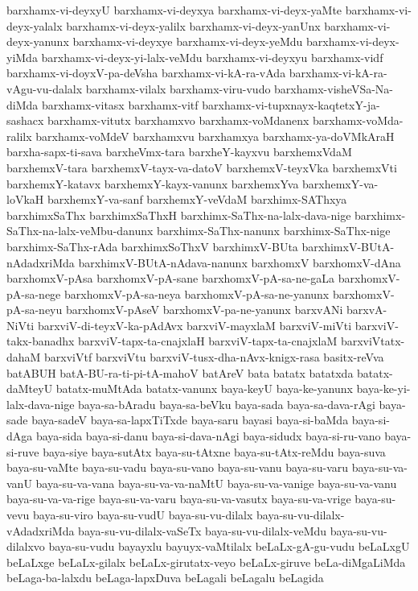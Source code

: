 {barxhamx-vi-deyxyU
barxhamx-vi-deyxya
barxhamx-vi-deyx-yaMte
barxhamx-vi-deyx-yalalx
barxhamx-vi-deyx-yalilx
barxhamx-vi-deyx-yanUnx
barxhamx-vi-deyx-yanunx
barxhamx-vi-deyxye
barxhamx-vi-deyx-yeMdu
barxhamx-vi-deyx-yiMda
barxhamx-vi-deyx-yi-lalx-veMdu
barxhamx-vi-deyxyu
barxhamx-vidf
barxhamx-vi-doyxV-pa-deVsha
barxhamx-vi-kA-ra-vAda
barxhamx-vi-kA-ra-vAgu-vu-dalalx
barxhamx-vilalx
barxhamx-viru-vudo
barxhamx-visheVSa-Na-diMda
barxhamx-vitasx
barxhamx-vitf
barxhamx-vi-tupxnayx-kaqtetxY-ja-sashacx
barxhamx-vitutx
barxhamxvo
barxhamx-voMdanenx
barxhamx-voMda-ralilx
barxhamx-voMdeV
barxhamxvu
barxhamxya
barxhamx-ya-doVMkAraH
barxha-sapx-ti-sava
barxheVmx-tara
barxheY-kayxvu
barxhemxVdaM
barxhemxV-tara
barxhemxV-tayx-va-datoV
barxhemxV-teyxVka
barxhemxVti
barxhemxY-katavx
barxhemxY-kayx-vanunx
barxhemxYva
barxhemxY-va-loVkaH
barxhemxY-va-sanf
barxhemxY-veVdaM
barxhimx-SAThxya
barxhimxSaThx
barxhimxSaThxH
barxhimx-SaThx-na-lalx-dava-nige
barxhimx-SaThx-na-lalx-veMbu-danunx
barxhimx-SaThx-nanunx
barxhimx-SaThx-nige
barxhimx-SaThx-rAda
barxhimxSoThxV
barxhimxV-BUta
barxhimxV-BUtA-nAdadxriMda
barxhimxV-BUtA-nAdava-nanunx
barxhomxV
barxhomxV-dAna
barxhomxV-pAsa
barxhomxV-pA-sane
barxhomxV-pA-sa-ne-gaLa
barxhomxV-pA-sa-nege
barxhomxV-pA-sa-neya
barxhomxV-pA-sa-ne-yanunx
barxhomxV-pA-sa-neyu
barxhomxV-pAseV
barxhomxV-pa-ne-yanunx
barxvANi
barxvA-NiVti
barxviV-di-teyxV-ka-pAdAvx
barxviV-mayxlaM
barxviV-miVti
barxviV-takx-banadhx
barxviV-tapx-ta-cnajxlaH
barxviV-tapx-ta-cnajxlaM
barxviVtatx-dahaM
barxviVtf
barxviVtu
barxviV-tusx-dha-nAvx-knigx-rasa
basitx-reVva
batABUH
batA-BU-ra-ti-pi-tA-mahoV
batAreV
bata
batatx
batatxda
batatx-daMteyU
batatx-muMtAda
batatx-vanunx
baya-keyU
baya-ke-yanunx
baya-ke-yi-lalx-dava-nige
baya-sa-bAradu
baya-sa-beVku
baya-sada
baya-sa-dava-rAgi
baya-sade
baya-sadeV
baya-sa-lapxTiTxde
baya-saru
bayasi
baya-si-baMda
baya-si-dAga
baya-sida
baya-si-danu
baya-si-dava-nAgi
baya-sidudx
baya-si-ru-vano
baya-si-ruve
baya-siye
baya-sutAtx
baya-su-tAtxne
baya-su-tAtx-reMdu
baya-suva
baya-su-vaMte
baya-su-vadu
baya-su-vano
baya-su-vanu
baya-su-varu
baya-su-va-vanU
baya-su-va-vana
baya-su-va-va-naMtU
baya-su-va-vanige
baya-su-va-vanu
baya-su-va-va-rige
baya-su-va-varu
baya-su-va-vasutx
baya-su-va-vrige
baya-su-vevu
baya-su-viro
baya-su-vudU
baya-su-vu-dilalx
baya-su-vu-dilalx-vAdadxriMda
baya-su-vu-dilalx-vaSeTx
baya-su-vu-dilalx-veMdu
baya-su-vu-dilalxvo
baya-su-vudu
bayayxlu
bayuyx-vaMtilalx
beLaLx-gA-gu-vudu
beLaLxgU
beLaLxge
beLaLx-gilalx
beLaLx-girutatx-veyo
beLaLx-giruve
beLa-diMgaLiMda
beLaga-ba-lalxdu
beLaga-lapxDuva
beLagali
beLagalu
beLagida
}
